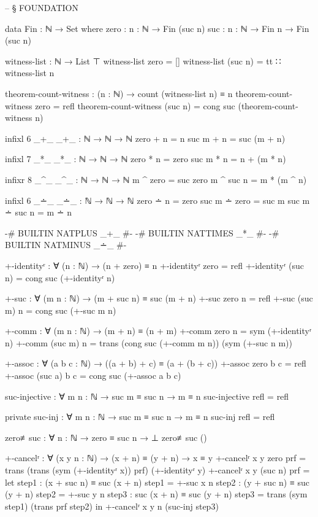 \documentclass[11pt,a4paper]{book}
\begin{document}
\begin{code}
-- § FOUNDATION

data Fin : ℕ → Set where
  zero : {n : ℕ} → Fin (suc n)
  suc  : {n : ℕ} → Fin n → Fin (suc n)

witness-list : ℕ → List ⊤
witness-list zero    = []
witness-list (suc n) = tt ∷ witness-list n

theorem-count-witness : (n : ℕ) → count (witness-list n) ≡ n
theorem-count-witness zero    = refl
theorem-count-witness (suc n) = cong suc (theorem-count-witness n)

infixl 6 _+_
_+_ : ℕ → ℕ → ℕ
zero  + n = n
suc m + n = suc (m + n)

infixl 7 _*_
_*_ : ℕ → ℕ → ℕ
zero  * n = zero
suc m * n = n + (m * n)

infixr 8 _^_
_^_ : ℕ → ℕ → ℕ
m ^ zero    = suc zero
m ^ suc n   = m * (m ^ n)

infixl 6 _∸_
_∸_ : ℕ → ℕ → ℕ
zero  ∸ n     = zero
suc m ∸ zero  = suc m
suc m ∸ suc n = m ∸ n

{-# BUILTIN NATPLUS  _+_ #-}
{-# BUILTIN NATTIMES _*_ #-}
{-# BUILTIN NATMINUS _∸_ #-}

+-identityʳ : ∀ (n : ℕ) → (n + zero) ≡ n
+-identityʳ zero    = refl
+-identityʳ (suc n) = cong suc (+-identityʳ n)

+-suc : ∀ (m n : ℕ) → (m + suc n) ≡ suc (m + n)
+-suc zero    n = refl
+-suc (suc m) n = cong suc (+-suc m n)

+-comm : ∀ (m n : ℕ) → (m + n) ≡ (n + m)
+-comm zero    n = sym (+-identityʳ n)
+-comm (suc m) n = trans (cong suc (+-comm m n)) (sym (+-suc n m))

+-assoc : ∀ (a b c : ℕ) → ((a + b) + c) ≡ (a + (b + c))
+-assoc zero    b c = refl
+-assoc (suc a) b c = cong suc (+-assoc a b c)

suc-injective : ∀ {m n : ℕ} → suc m ≡ suc n → m ≡ n
suc-injective refl = refl

private
  suc-inj : ∀ {m n : ℕ} → suc m ≡ suc n → m ≡ n
  suc-inj refl = refl

zero≢suc : ∀ {n : ℕ} → zero ≡ suc n → ⊥
zero≢suc ()

+-cancelʳ : ∀ (x y n : ℕ) → (x + n) ≡ (y + n) → x ≡ y
+-cancelʳ x y zero prf = 
  trans (trans (sym (+-identityʳ x)) prf) (+-identityʳ y)
+-cancelʳ x y (suc n) prf = 
  let step1 : (x + suc n) ≡ suc (x + n)
      step1 = +-suc x n
      step2 : (y + suc n) ≡ suc (y + n)
      step2 = +-suc y n
      step3 : suc (x + n) ≡ suc (y + n)
      step3 = trans (sym step1) (trans prf step2)
  in +-cancelʳ x y n (suc-inj step3)


\end{code}
\end{document}
